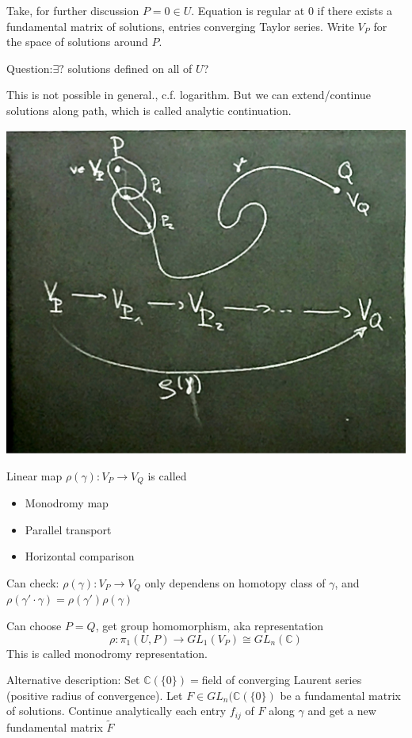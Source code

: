 \documentclass[11pt]{article}
\newcommand{\cplx}{\mathbb C}
\newcommand{\lrta}{\longrightarrow}
\begin{document}
Take, for further discussion $P=0\in U$. Equation is regular at $0$ if there exists a fundamental matrix of solutions, entries converging Taylor series. Write $V_P$ for the space of solutions around $P$.

Question:$\exists ?$ solutions defined on all of $U$?

This is not possible in general., c.f. logarithm. But we can extend/continue solutions along path, which is called analytic continuation.

\includegraphics[scale=0.3]{Analyitc_continuation.png}

Linear map $\rho(\gamma):V_P\lrta V_Q$ is called 
\begin{itemize}
	\item Monodromy map
	\item Parallel transport
	\item Horizontal comparison
\end{itemize}
Can check: $\rho(\gamma):V_P\lrta V_Q $ only dependens on homotopy class of $\gamma$, and $\rho(\gamma'\cdot \gamma)=\rho(\gamma')\rho(\gamma)$

Can choose  $P=Q$, get group homomorphism, aka representation 
$$
\rho: \pi_1(U,P)\lrta GL_1(V_P)\cong GL_n(\cplx)
$$
This is called monodromy
representation. 

Alternative description: Set $\cplx(\{0\})=$field of converging Laurent series (positive radius of convergence). Let $F\in GL_n(\cplx(\{0\})$ be a fundamental matrix of solutions. Continue analytically each entry $f_{ij}$ of $F$ along $\gamma$ and get a new fundamental matrix $\tilde{F}$
\end{document}
